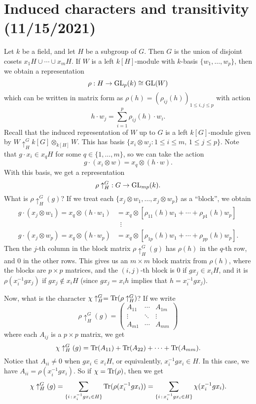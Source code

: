 \section{Induced characters and transitivity (11/15/2021)}
Let $k$ be a field, and let $H$ be a subgroup of $G$. Then $G$ is the 
union of disjoint cosets $x_1H \cup \cdots \cup x_mH$. If $W$ is a 
left $k[H]$-module with $k$-basis $\{w_1, \dots, w_p\}$, then we obtain 
a representation
\[ \rho : H \to \operatorname{GL}_p(k) \cong \operatorname{GL}(W) \] 
which can be written in matrix form as $\rho(h) = (\rho_{ij}(h))_{1\leq i,j\leq p}$
with action 
\[ h \cdot w_j = \sum_{i=1}^p \rho_{ij}(h) \cdot w_i. \] 
Recall that the induced representation of $W$ up to $G$ is a left $k[G]$-module 
given by $W \uparrow_H^G k[G] \otimes_{k[H]} W$. This has basis 
$\{x_i \otimes w_j : 1 \leq i \leq m,\, 1 \leq j \leq p\}$. Note that 
$g \cdot x_i \in x_qH$ for some $q \in \{1, \dots, m\}$, so we can take the action 
\[ g \cdot (x_i \otimes w) = x_q \otimes (h \cdot w). \] 
With this basis, we get a representation 
\[ \rho \uparrow_H^G\;: G \to \operatorname{GL}_{mp}(k). \] 
What is $\rho \uparrow_H^G(g)$? If we treat each $\{x_j \otimes w_1, \dots, 
x_j \otimes w_p\}$ as a ``block'', we obtain 
\begin{align*}
    g \cdot (x_j \otimes w_1) = x_q \otimes (h \cdot w_1) &= 
    x_q \otimes [\rho_{11}(h) w_1 + \cdots + \rho_{p1}(h) w_p] \\ 
    &\;\;\vdots \\ 
    g \cdot (x_j \otimes w_p) = x_q \otimes (h \cdot w_p) &= 
    x_q \otimes [\rho_{1p}(h) w_1 + \cdots + \rho_{pp}(h) w_p]. 
\end{align*}
Then the $j$-th column in the block matrix $\rho \uparrow_H^G(g)$ has 
$\rho(h)$ in the $q$-th row, and $0$ in the other rows. This gives us 
an $m \times m$ block matrix from $\rho(h)$, where the blocks are 
$p \times p$ matrices, and the $(i, j)$-th block is $0$ if $gx_j \in x_i H$, 
and it is $\rho(x_i^{-1}gx_j)$ if $gx_j \notin x_i H$ (since 
$gx_j = x_ih$ implies that $h = x_i^{-1}gx_j$).

Now, what is the character $\chi \uparrow_H^G = \operatorname{Tr}(\rho \uparrow_H^G)$? 
If we write 
\[ \rho \uparrow_H^G(g) = \begin{pmatrix}
    A_{11} & \cdots & A_{1m} \\ 
    \vdots & \ddots & \vdots \\ 
    A_{m1} & \cdots & A_{mm}
\end{pmatrix} \] 
where each $A_{ij}$ is a $p \times p$ matrix, we get 
\[ \chi \uparrow_H^G(g) = \operatorname{Tr}(A_{11}) + \operatorname{Tr}(A_{22}) + \cdots + \operatorname{Tr}(A_{mm}). \] 
Notice that $A_{ii} \neq 0$ when $gx_i \in x_iH$, or equivalently, 
$x_i^{-1}gx_i \in H$. In this case, we have $A_{ii} = \rho(x_i^{-1}gx_i)$. 
So if $\chi = \operatorname{Tr}(\rho)$, then we get 
\[ \chi \uparrow_H^G(g) = \sum_{\{i\,:\,x_i^{-1}gx_i \in H\}} 
\operatorname{Tr}(\rho(x_i^{-1}gx_i)) = \sum_{\{i\,:\,x_i^{-1}gx_i \in H\}} \chi(x_i^{-1}gx_i). \] 

